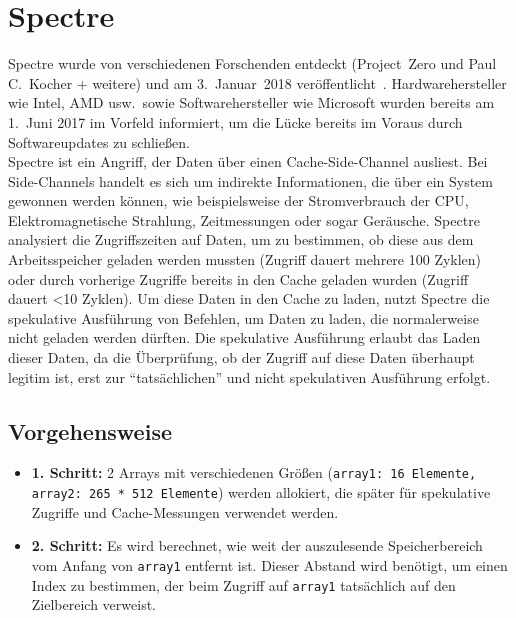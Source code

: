 \section{Spectre}
\label{sec:spectre}

Spectre wurde von verschiedenen Forschenden entdeckt (Project~Zero und Paul C.~Kocher + weitere) und am 3.~Januar~2018 veröffentlicht~\cite{kocher2018spectre}.
Hardwarehersteller wie Intel, AMD usw.~sowie Softwarehersteller wie Microsoft wurden bereits am 1.~Juni 2017 im Vorfeld informiert, um die Lücke bereits im Voraus durch Softwareupdates zu schließen. \\
Spectre ist ein Angriff, der Daten über einen Cache-Side-Channel ausliest.
Bei Side-Channels handelt es sich um indirekte Informationen, die über ein System gewonnen werden können, wie beispielsweise der Stromverbrauch der CPU, Elektromagnetische Strahlung, Zeitmessungen oder sogar Geräusche.
Spectre analysiert die Zugriffszeiten auf Daten, um zu bestimmen, ob diese aus dem Arbeitsspeicher geladen werden mussten (Zugriff dauert mehrere 100 Zyklen) oder durch vorherige Zugriffe bereits in den Cache geladen wurden (Zugriff dauert <10 Zyklen).
Um diese Daten in den Cache zu laden, nutzt Spectre die spekulative Ausführung von Befehlen, um Daten zu laden, die normalerweise nicht geladen werden dürften.
Die spekulative Ausführung erlaubt das Laden dieser Daten, da die Überprüfung, ob der Zugriff auf diese Daten überhaupt legitim ist, erst zur \enquote{tatsächlichen} und nicht spekulativen Ausführung erfolgt.

\subsection{Vorgehensweise}
\label{subsec:vorgehensweise}%
\begin{itemize}
    \item \textbf{1. Schritt:} 2 Arrays mit verschiedenen Größen (\texttt{array1: 16 Elemente, array2: 265 * 512 Elemente}) werden allokiert, die später für spekulative Zugriffe und Cache-Messungen verwendet werden.
    \item \textbf{2. Schritt:} Es wird berechnet, wie weit der auszulesende Speicherbereich vom Anfang von \texttt{array1} entfernt ist.
    Dieser Abstand wird benötigt, um einen Index zu bestimmen, der beim Zugriff auf \texttt{array1} tatsächlich auf den Zielbereich verweist.
\end{itemize}

